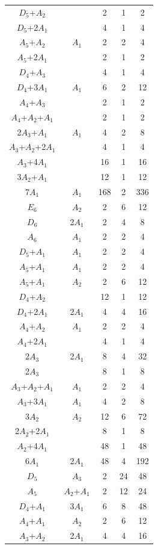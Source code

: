 \documentclass[12pt]{report}
\begin{document}
\begin{appendix}
{\begin{longtable}{ccccc}
$D_5$+$A_2$ &  & 2 & 1 & 2 \\
$D_5$+2$A_1$ &  & 4 & 1 & 4 \\
$A_5$+$A_2$ & $A_1$ & 2 & 2 & 4 \\
$A_5$+2$A_1$ &  & 2 & 1 & 2 \\
$D_4$+$A_3$ &  & 4 & 1 & 4 \\
$D_4$+3$A_1$ & $A_1$ & 6 & 2 & 12 \\
$A_4$+$A_3$ &  & 2 & 1 & 2 \\
$A_4$+$A_2$+$A_1$ &  & 2 & 1 & 2 \\
2$A_3$+$A_1$ & $A_1$ & 4 & 2 & 8 \\
$A_3$+$A_2$+2$A_1$ &  & 4 & 1 & 4 \\
$A_3$+4$A_1$ &  & 16 & 1 & 16 \\
3$A_2$+$A_1$ &  & 12 & 1 & 12 \\
7$A_1$ & $A_1$ & 168 & 2 & 336 \\
$E_6$ & $A_2$ & 2 & 6 & 12 \\
$D_6$ & 2$A_1$ & 2 & 4 & 8 \\
$A_6$ & $A_1$ & 2 & 2 & 4 \\
$D_5$+$A_1$ & $A_1$ & 2 & 2 & 4 \\
$A_5$+$A_1$ & $A_1$ & 2 & 2 & 4 \\
$A_5$+$A_1$ & $A_2$ & 2 & 6 & 12 \\
$D_4$+$A_2$ &  & 12 & 1 & 12 \\
$D_4$+2$A_1$ & 2$A_1$ & 4 & 4 & 16 \\
$A_4$+$A_2$ & $A_1$ & 2 & 2 & 4 \\
$A_4$+2$A_1$ &  & 4 & 1 & 4 \\
2$A_3$ & 2$A_1$ & 8 & 4 & 32 \\
2$A_3$ &  & 8 & 1 & 8 \\
$A_3$+$A_2$+$A_1$ & $A_1$ & 2 & 2 & 4 \\
$A_3$+3$A_1$ & $A_1$ & 4 & 2 & 8 \\
3$A_2$ & $A_2$ & 12 & 6 & 72 \\
2$A_2$+2$A_1$ &  & 8 & 1 & 8 \\
$A_2$+4$A_1$ &  & 48 & 1 & 48 \\
6$A_1$ & 2$A_1$ & 48 & 4 & 192 \\
$D_5$ & $A_3$ & 2 & 24 & 48 \\
$A_5$ & $A_2$+$A_1$ & 2 & 12 & 24 \\
$D_4$+$A_1$ & 3$A_1$ & 6 & 8 & 48 \\
$A_4$+$A_1$ & $A_2$ & 2 & 6 & 12 \\
$A_3$+$A_2$ & 2$A_1$ & 4 & 4 & 16 \\

\end{longtable}}
\end{appendix}
\end{document}
